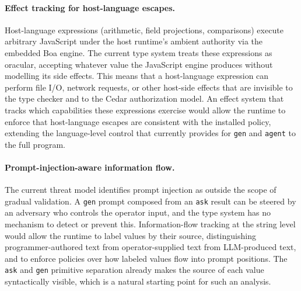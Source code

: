 \paragraph{Effect tracking for host-language escapes.}
Host-language expressions (arithmetic, field projections, comparisons) 
execute arbitrary JavaScript under the host runtime's ambient 
authority via the embedded Boa engine. The current type system treats 
these expressions as oracular, accepting whatever value the JavaScript 
engine produces without modelling its side effects. This means 
that a host-language expression can perform file I/O, network requests, 
or other host-side effects that are invisible to the \pact{} type 
checker and to the Cedar authorization model. An effect system 
that tracks which capabilities these expressions exercise would 
allow the runtime to enforce that host-language escapes are 
consistent with the installed policy, extending the 
language-level control that \pact{} currently provides for 
\texttt{gen} and \texttt{agent} to the full program.

\begin{sloppypar}
\paragraph{Prompt-injection-aware information flow.}
The current threat model identifies prompt injection as outside
the scope of gradual validation. A \texttt{gen} prompt composed
from an \texttt{ask} result can be steered by an adversary who
controls the operator input, and the type system has no mechanism
to detect or prevent this. Information-flow tracking at the string
level would allow the runtime to label values by their source,
distinguishing programmer-authored text from operator-supplied
text from LLM-produced text, and to enforce policies over how
labeled values flow into prompt positions. The \texttt{ask} and
\texttt{gen} primitive separation already makes the source of each
value syntactically visible, which is a natural starting point
for such an analysis.
\end{sloppypar}

